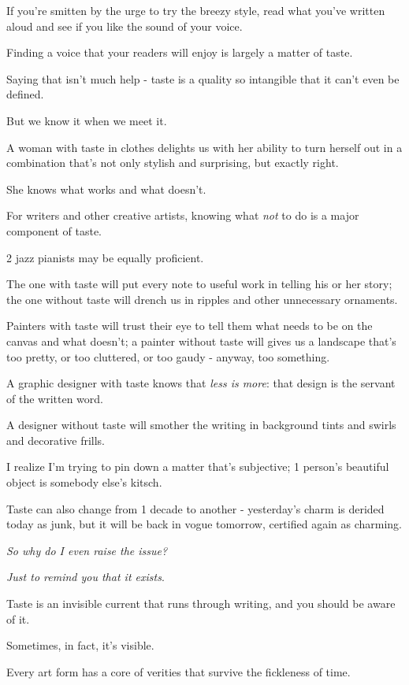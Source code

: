 \documentclass{book}
\numberwithin{equation}{section}
\begin{document}
If you're smitten by the urge to try the breezy style, read what you've written aloud and see if you like the sound of your voice.

%
Finding a voice that your readers will enjoy is largely a matter of taste.

Saying that isn't much help - taste is a quality so intangible that it can't even be defined.

But we know it when we meet it.

A woman with taste in clothes delights us with her ability to turn herself out in a combination that's not only stylish and surprising, but exactly right.

She knows what works and what doesn't.

For writers and other creative artists, knowing what \textit{not} to do is a major component of taste.

2 jazz pianists may be equally proficient.

The one with taste will put every note to useful work in telling his or her story; the one without taste will drench us in ripples and other unnecessary ornaments.

Painters with taste will trust their eye to tell them what needs to be on the canvas and what doesn't; a painter without taste will gives us a landscape that's too pretty, or too cluttered, or too gaudy - anyway, too something.

A graphic designer with taste knows that \textit{less is more}: that design is the servant of the written word.

A designer without taste will smother the writing in background tints and swirls and decorative frills.

%
I realize I'm trying to pin down a matter that's subjective; 1 person's beautiful object is somebody else's kitsch.

Taste can also change from 1 decade to another - yesterday's charm is derided today as junk, but it will be back in vogue tomorrow, certified again as charming.

\textit{So why do I even raise the issue?}

\textit{Just to remind you that it exists}.

Taste is an invisible current that runs through writing, and you should be aware of it.

%
Sometimes, in fact, it's visible.

Every art form has a core of verities that survive the fickleness of time.
\end{document}
